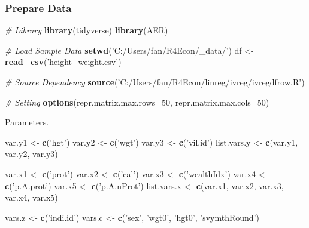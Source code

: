 \documentclass[
]{book}
\newenvironment{Shaded}{\begin{snugshade}}{\end{snugshade}}
\newcommand{\CommentTok}[1]{\textcolor[rgb]{0.56,0.35,0.01}{\textit{#1}}}
\newcommand{\DataTypeTok}[1]{\textcolor[rgb]{0.13,0.29,0.53}{#1}}
\newcommand{\DecValTok}[1]{\textcolor[rgb]{0.00,0.00,0.81}{#1}}
\newcommand{\KeywordTok}[1]{\textcolor[rgb]{0.13,0.29,0.53}{\textbf{#1}}}
\newcommand{\NormalTok}[1]{#1}
\newcommand{\StringTok}[1]{\textcolor[rgb]{0.31,0.60,0.02}{#1}}
\begin{document}
\hypertarget{prepare-data}{%
\subsubsection{Prepare Data}\label{prepare-data}}

\begin{Shaded}
\begin{Highlighting}[]
\CommentTok{# Library}
\KeywordTok{library}\NormalTok{(tidyverse)}
\KeywordTok{library}\NormalTok{(AER)}

\CommentTok{# Load Sample Data}
\KeywordTok{setwd}\NormalTok{(}\StringTok{'C:/Users/fan/R4Econ/_data/'}\NormalTok{)}
\NormalTok{df <-}\StringTok{ }\KeywordTok{read_csv}\NormalTok{(}\StringTok{'height_weight.csv'}\NormalTok{)}

\CommentTok{# Source Dependency}
\KeywordTok{source}\NormalTok{(}\StringTok{'C:/Users/fan/R4Econ/linreg/ivreg/ivregdfrow.R'}\NormalTok{)}

\CommentTok{# Setting}
\KeywordTok{options}\NormalTok{(}\DataTypeTok{repr.matrix.max.rows=}\DecValTok{50}\NormalTok{, }\DataTypeTok{repr.matrix.max.cols=}\DecValTok{50}\NormalTok{)}
\end{Highlighting}
\end{Shaded}

Parameters.

\begin{Shaded}
\begin{Highlighting}[]
\NormalTok{var.y1 <-}\StringTok{ }\KeywordTok{c}\NormalTok{(}\StringTok{'hgt'}\NormalTok{)}
\NormalTok{var.y2 <-}\StringTok{ }\KeywordTok{c}\NormalTok{(}\StringTok{'wgt'}\NormalTok{)}
\NormalTok{var.y3 <-}\StringTok{ }\KeywordTok{c}\NormalTok{(}\StringTok{'vil.id'}\NormalTok{)}
\NormalTok{list.vars.y <-}\StringTok{ }\KeywordTok{c}\NormalTok{(var.y1, var.y2, var.y3)}

\NormalTok{var.x1 <-}\StringTok{ }\KeywordTok{c}\NormalTok{(}\StringTok{'prot'}\NormalTok{)}
\NormalTok{var.x2 <-}\StringTok{ }\KeywordTok{c}\NormalTok{(}\StringTok{'cal'}\NormalTok{)}
\NormalTok{var.x3 <-}\StringTok{ }\KeywordTok{c}\NormalTok{(}\StringTok{'wealthIdx'}\NormalTok{)}
\NormalTok{var.x4 <-}\StringTok{ }\KeywordTok{c}\NormalTok{(}\StringTok{'p.A.prot'}\NormalTok{)}
\NormalTok{var.x5 <-}\StringTok{ }\KeywordTok{c}\NormalTok{(}\StringTok{'p.A.nProt'}\NormalTok{)}
\NormalTok{list.vars.x <-}\StringTok{ }\KeywordTok{c}\NormalTok{(var.x1, var.x2, var.x3, var.x4, var.x5)}

\NormalTok{vars.z <-}\StringTok{ }\KeywordTok{c}\NormalTok{(}\StringTok{'indi.id'}\NormalTok{)}
\NormalTok{vars.c <-}\StringTok{ }\KeywordTok{c}\NormalTok{(}\StringTok{'sex'}\NormalTok{, }\StringTok{'wgt0'}\NormalTok{, }\StringTok{'hgt0'}\NormalTok{, }\StringTok{'svymthRound'}\NormalTok{)}
\end{Highlighting}
\end{Shaded}
\end{document}
